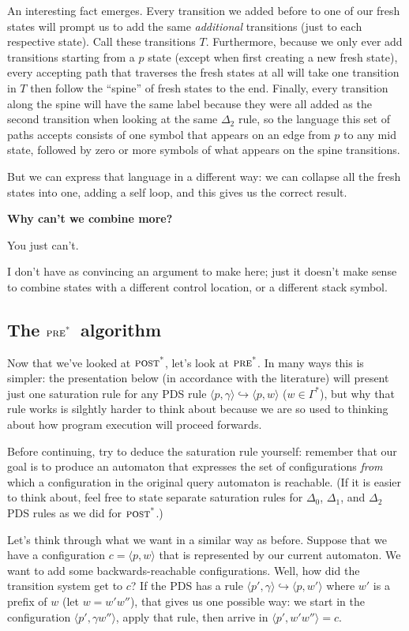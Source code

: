 \documentclass{article}
\newcommand{\Config}[2]{\ensuremath{\langle #1, #2 \rangle}}
\newcommand{\Rule}[2]{\ensuremath{#1 \hookrightarrow #2}}
\newcommand{\subsubsubsection}[1]{\textbf{#1}}
\newcommand{\poststar}{\ensuremath{\textsc{post}^\textsc{*}}}
\newcommand{\prestar}{\ensuremath{\textsc{pre}^\textsc{*}}}
\begin{document}
An interesting fact emerges. Every transition we added before to one
of our fresh states will prompt us to add the same \emph{additional}
transitions (just to each respective state). Call these transitions
$T$.  Furthermore, because we only ever add transitions starting from
a $p$ state (except when first creating a new fresh state), every
accepting path that traverses the fresh states at all will take one
transition in $T$ then follow the ``spine'' of fresh states to the
end. Finally, every transition along the spine will have the same
label because they were all added as the second transition when
looking at the same $\Delta_2$ rule, so the language this set of paths
accepts consists of one symbol that appears on an edge from $p$ to any
mid state, followed by zero or more symbols of what appears on the
spine transitions.

But we can express that language in a different way: we can collapse
all the fresh states into one, adding a self loop, and this gives us
the correct result.

\subsubsubsection{Why can't we combine more?}

You just can't.

I don't have as convincing an argument to make here; just it doesn't
make sense to combine states with a different control location, or a
different stack symbol.


\subsection{The \prestar\ algorithm}

Now that we've looked at \poststar, let's look at \prestar. In many
ways this is simpler: the presentation below (in accordance with the
literature) will present just one saturation rule for any PDS rule
\Rule{\Config{p}{\gamma}}{\Config{p}{w}} ($w \in \Gamma^*$), but why
that rule works is silghtly harder to think about because we are so
used to thinking about how program execution will proceed forwards.

Before continuing, try to deduce the saturation rule yourself:
remember that our goal is to produce an automaton that expresses the
set of configurations \emph{from} which a configuration in the
original query automaton is reachable. (If it is easier to think
about, feel free to state separate saturation rules for $\Delta_0$,
$\Delta_1$, and $\Delta_2$ PDS rules as we did for \poststar.)

Let's think through what we want in a similar way as before. Suppose
that we have a configuration $c = \Config{p}{w}$ that is represented
by our current automaton. We want to add some backwards-reachable
configurations. Well, how did the transition system get to $c$? If the
PDS has a rule \Rule{\Config{p'}{\gamma}}{\Config{p}{w'}} where $w'$
is a prefix of $w$ (let $w = w'w''$), that gives us one possible way:
we start in the configuration \Config{p'}{\gamma w''}, apply that
rule, then arrive in $\Config{p'}{w'w''} = c$.
\end{document}
